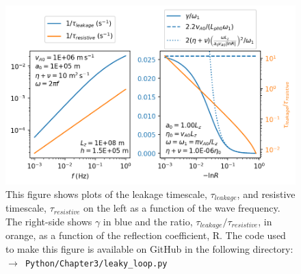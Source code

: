 \begin{figure}
    \vspace{-20pt}
    \centering
    \includegraphics[width=\textwidth,height=0.85\textheight,keepaspectratio]{figures/chapter03/leaky_loop.png}
    \vspace{-35pt}
    \caption{This figure shows plots of the leakage timescale, $\tau_{leakage}$, and resistive timescale, $\tau_{resistive}$ on the left as a function of the wave frequency. The right-side shows $\gamma$ in blue and the ratio, $\tau_{leakage}/\tau_{resistive}$, in orange, as a function of the reflection coefficient, R. The code used to make this figure is available on GitHub in the following directory:\newline
    \texttt{$\rightarrow$ Python/Chapter3/leaky\_loop.py}}
    \label{fig:chap_3_leaky_loop}
    \vspace{-15pt}
\end{figure}

